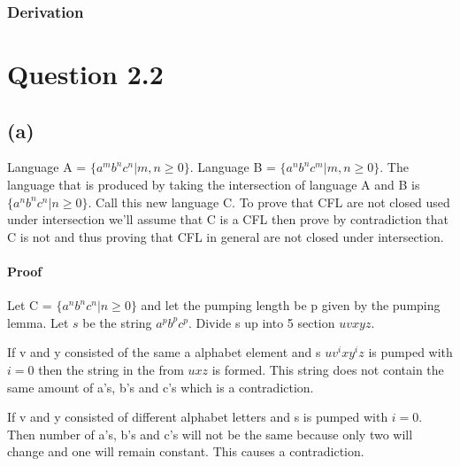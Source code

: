 \documentclass[a4paper, 10pt]{article}
\begin{document}
\subsubsection*{Derivation}
  \section*{Question 2.2}
  \subsection*{(a)}
  Language A = $\{a^{m}b^{n}c^{n}|m,n \geq 0\}$.
  Language B = $\{a^{n}b^{n}c^{m}|m,n \geq 0\}$.
  The language that is produced by taking the 
  intersection of language A and B is $\{a^{n}b^{n}c^{n}|n \geq 0\}$. Call this new language C.
  To prove that CFL are not closed used under intersection we'll
  assume that C is a CFL then prove by contradiction that C is not and thus proving that CFL in general are not closed under intersection.
  \paragraph*{Proof}
  Let C = $\{a^{n}b^{n}c^{n}|n \geq 0\}$ and let the pumping length be p given by the pumping lemma. Let $s$ be the string $a^{p}b^{p}c^{p}$.
 Divide s up into 5 section $uvxyz$.
 
 If v and y consisted of the same a alphabet element and s $uv^{i}xy^{i}z$ is pumped with $i = 0$ then the string in the from $uxz$ is formed. This string does not contain the same amount of a's, b's and c's which is a contradiction. 
 
 If v and y consisted of different alphabet letters and s is pumped with $i = 0$. Then number of a's, b's and c's will
 not be the same because only two will change and one will remain constant. This causes a contradiction.
 
\end{document}
